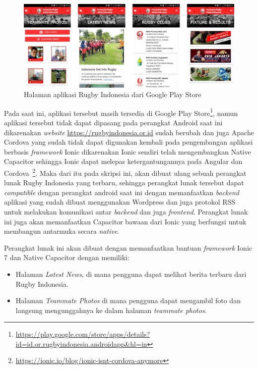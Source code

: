 \begin{figure} [!h]
    \centering
    \includegraphics[scale=0.725]{Gambar/Rugby-Indonesia-App-UI.png}
    \caption[Halaman aplikasi Rugby Indonesia]{Halaman aplikasi Rugby Indonesia dari Google Play Store}
    \label{fig:rugby-halaman-label}
\end{figure}

Pada saat ini, aplikasi tersebut masih tersedia di Google Play Store\footnote{\url{https://play.google.com/store/apps/details?id=id.or.rugbyindonesia.androidapp\&hl=in}}, namun aplikasi tersebut tidak dapat dipasang pada perangkat Android saat ini dikarenakan \textit{website} \url{https://rugbyindonesia.or.id} sudah berubah dan juga Apache Cordova yang sudah tidak dapat digunakan kembali pada pengembangan aplikasi berbasis \textit{framework} Ionic dikarenakan Ionic sendiri telah mengembangkan Native Capacitor sehingga Ionic dapat melepas ketergantungannya pada Angular dan Cordova~\footnote{\url{https://ionic.io/blog/ionic-isnt-cordova-anymore}}. Maka dari itu pada skripsi ini, akan dibuat ulang sebuah perangkat lunak Rugby Indonesia yang terbaru, sehingga perangkat lunak tersebut dapat \textit{compatible} dengan perangkat android saat ini dengan memanfaatkan \textit{backend} aplikasi yang sudah dibuat menggunakan Wordpress dan juga protokol RSS untuk melakukan komunikasi antar \textit{backend} dan juga \textit{frontend}. Perangkat lunak ini juga akan memanfaatkan Capacitor bawaan dari Ionic yang berfungsi untuk membangun antarmuka secara \textit{native}.

Perangkat lunak ini akan dibuat dengan memanfaatkan bantuan {\it framework} Ionic 7 dan Native Capacitor dengan memiliki:
\begin{itemize}
    \item Halaman \textit{Latest News}, di mana pengguna dapat melihat berita terbaru dari Rugby Indonesia.
    \item Halaman \textit{Teammate Photos} di mana pengguna dapat mengambil foto dan langsung mengunggahnya ke dalam halaman \textit{teammate photos}.
\end{itemize}


